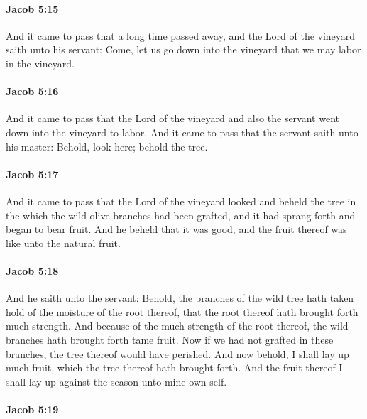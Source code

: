 		\paragraph{Jacob 5:15} %
			\label{JACOB-5-15}

			And it came to pass that a long time passed away,
			and the Lord of the vineyard saith unto his servant:
			Come, let us go down into the vineyard
			that we may labor in the vineyard.

		\paragraph{Jacob 5:16} %
			\label{JACOB-5-16}

			And it came to pass that the Lord of the vineyard and also the servant
			went down into the vineyard to labor.
			And it came to pass that the servant saith unto his master:
			Behold, look here; behold the tree.

		\paragraph{Jacob 5:17} %
			\label{JACOB-5-17}

			And it came to pass that the Lord of the vineyard looked
			and beheld the tree in the which the wild olive branches had been grafted,
			and it had sprang forth and began to bear fruit.
			And he beheld that it was good,
			and the fruit thereof was like unto the natural fruit.

		\paragraph{Jacob 5:18} %
			\label{JACOB-5-18}

			And he saith unto the servant:
			Behold, the branches of the wild tree
			hath taken hold of the moisture of the root thereof,
			that the root thereof hath brought forth much strength.
			And because of the much strength of the root thereof,
			the wild branches hath brought forth tame fruit.
			Now if we had not grafted in these branches,
			the tree thereof would have perished.
			And now behold, I shall lay up much fruit,
			which the tree thereof hath brought forth.
			And the fruit thereof I shall lay up against the season unto mine own self.

		\paragraph{Jacob 5:19} %
			\label{JACOB-5-19}

